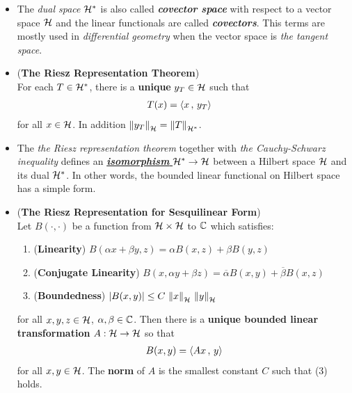 \documentclass[11pt]{article}
\begin{document}
\begin{itemize}
\item \begin{remark}
The \emph{dual space} ${\mathcal H}^{*}$ is also called \emph{\textbf{covector space}} with respect to a vector space ${\mathcal H}$ and the linear functionals are called \emph{\textbf{covectors}}. This terms are mostly used in \emph{differential geometry} when the vector space is \emph{the tangent space}.
\end{remark}

\item \begin{theorem} (\textbf{The Riesz Representation Theorem}) \citep{reed1980methods, kreyszig1989introductory, conway2019course} \\
For each $T \in {\mathcal H}^{*}$, there is a \textbf{unique} $y_{T} \in {\mathcal H}$ such that 
\begin{align*}
T(x) &= \left\langle x\,,\, y_T \right\rangle
\end{align*} for all $x \in {\mathcal H}$. In addition $\left\|y_{T}\right\|_{{\mathcal H}} = \left\|T\right\|_{{\mathcal H}^{*}}$.
\end{theorem}

\item \begin{remark}
The \emph{the Riesz representation theorem} together with \emph{the Cauchy-Schwarz inequality} defines an \underline{\emph{\textbf{isomorphism}}  ${\mathcal H}^{*} \rightarrow {\mathcal H}$} between a Hilbert space ${\mathcal H}$ and its dual ${\mathcal H}^{*}$. In other words, the bounded linear functional on Hilbert space has a simple form.
\end{remark}

\item \begin{corollary} (\textbf{The Riesz Representation for Sesquilinear Form})\\
Let $B(\cdot, \cdot)$ be a function from ${\mathcal H} \times  {\mathcal H}$ to ${\mathbb C}$ which satisfies:
\begin{enumerate}
\item (\textbf{Linearity}) $B(\alpha x + \beta y, z) = \alpha B(x, z) + \beta B(y, z)$
\item (\textbf{Conjugate Linearity}) $B(x, \alpha y + \beta z) = \overline{\alpha} B(x, y) + \overline{\beta} B(x, z)$
\item (\textbf{Boundedness}) $\left\lvert B(x, y) \right\rvert \le C\,\left\|x\right\|_{{\mathcal H}}\,\left\|y\right\|_{{\mathcal H}} $
\end{enumerate} for all $x, y, z \in {\mathcal H}$, $\alpha, \beta \in {\mathbb C}$. Then there is a \textbf{unique bounded linear transformation} $A: {\mathcal H} \rightarrow {\mathcal H}$ so that
\begin{align*}
B(x, y) = \left\langle Ax\,,\, y \right\rangle
\end{align*} for all $x, y \in {\mathcal H}$. The \textbf{norm} of $A$ is the smallest constant $C$ such that (3) holds.
\end{corollary}


\end{itemize}
\end{document}
